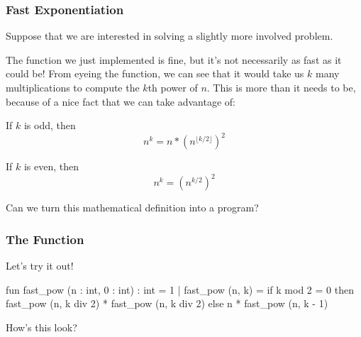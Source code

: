 \documentclass[aspectratio=169]{beamer}
\begin{document}

\begin{frame}[fragile]
  \frametitle{Fast Exponentiation}

  Suppose that we are interested in solving a slightly more involved problem.

  \pause
  \vspace{\fill}

  The  function we just implemented is fine, but it's not necessarily
  as fast as it could be! From eyeing the function, we can see that it would take
  us $k$ many multiplications to compute the $k$th power of $n$. This is more 
  than it needs to be, because of a nice fact that we can take advantage of:

  \pause
  \vspace{\fill}

  If $k$ is odd, then $$n^k = n * \left (n^{\lfloor k/2 \rfloor} \right )^2$$

  \pause

  If $k$ is even, then $$n^k = \left (n^{k/2} \right )^2$$

  \pause
  \vspace{\fill}

  Can we turn this mathematical definition into a program?
\end{frame}

\begin{frame}[fragile]
  \frametitle{The  Function}

  Let's try it out!

  \pause
  \begin{codeblock}
    fun fast_pow (n : int, 0 : int) : int = 1
      | fast_pow (n, k) =
          if k mod 2 = 0 then 
            fast_pow (n, k div 2) * fast_pow (n, k div 2)
          else
            n * fast_pow (n, k - 1)
  \end{codeblock}

  \vspace{\fill}

  How's this look?\footnotemark

\end{frame}
\end{document}

